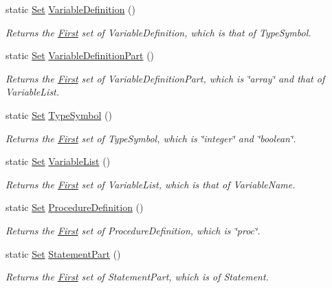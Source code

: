 \begin{DoxyCompactItemize}
static \hyperlink{classSet}{Set} \hyperlink{classFirst_aefcae573e31e01ae74204a6b9e44a36a}{VariableDefinition} ()
\begin{DoxyCompactList}\small\item\em Returns the \hyperlink{classFirst}{First} set of VariableDefinition, which is that of TypeSymbol. \item\end{DoxyCompactList}\item 
static \hyperlink{classSet}{Set} \hyperlink{classFirst_a9c91c3f1c5d87c2356cacf6e44200764}{VariableDefinitionPart} ()
\begin{DoxyCompactList}\small\item\em Returns the \hyperlink{classFirst}{First} set of VariableDefinitionPart, which is \char`\"{}array\char`\"{} and that of VariableList. \item\end{DoxyCompactList}\item 
static \hyperlink{classSet}{Set} \hyperlink{classFirst_aca3f9425bf421939aabc8b911fafdc65}{TypeSymbol} ()
\begin{DoxyCompactList}\small\item\em Returns the \hyperlink{classFirst}{First} set of TypeSymbol, which is \char`\"{}integer\char`\"{} and \char`\"{}boolean\char`\"{}. \item\end{DoxyCompactList}\item 
static \hyperlink{classSet}{Set} \hyperlink{classFirst_a53ff9cbd12b57f99e5b9b96f38d100b8}{VariableList} ()
\begin{DoxyCompactList}\small\item\em Returns the \hyperlink{classFirst}{First} set of VariableList, which is that of VariableName. \item\end{DoxyCompactList}\item 
static \hyperlink{classSet}{Set} \hyperlink{classFirst_ab17ecbd0c5f0a850227885ba86f15835}{ProcedureDefinition} ()
\begin{DoxyCompactList}\small\item\em Returns the \hyperlink{classFirst}{First} set of ProcedureDefinition, which is \char`\"{}proc\char`\"{}. \item\end{DoxyCompactList}\item 
static \hyperlink{classSet}{Set} \hyperlink{classFirst_a80a59db3d4fe3e008df01d475a96f354}{StatementPart} ()
\begin{DoxyCompactList}\small\item\em Returns the \hyperlink{classFirst}{First} set of StatementPart, which is of Statement. \item\end{DoxyCompactList}\item 

\end{DoxyCompactItemize}
